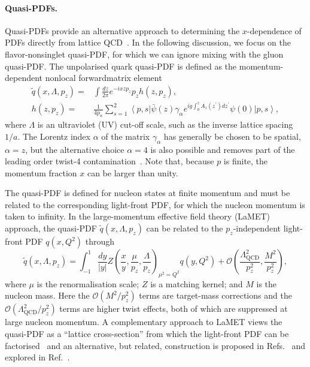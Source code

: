\paragraph*{Quasi-PDFs.}
Quasi-PDFs provide an alternative approach to determining the $x$-dependence of PDFs directly from lattice QCD~\cite{Ji:2013dva,Ji:2014gla}. In the following discussion, we focus on the flavor-nonsinglet quasi-PDF, for which we can ignore mixing with the gluon quasi-PDF. The unpolarised quark quasi-PDF is defined as the momentum-dependent
nonlocal forwardmatrix element
\begin{align}\label{eq:qPDF}
\widetilde{q}(x,\Lambda,p_z)  = {} &  \int \frac{dz}{2\pi} e^{-i x z p_z} p_z h(z,p_z), \nonumber \\
h(z,p_z) = {} &
\frac{1}{4 p_{\alpha}}\sum_{s=1}^2\left\langle p,s\right\vert \bar{\psi}(z)\gamma_\alpha e^{ig\int_0^z
A_z(z^\prime) dz^\prime} \psi(0) \left\vert p,s\right\rangle,
\end{align}
where $\Lambda$ is an ultraviolet (UV) cut-off scale, such as the inverse lattice spacing $1/a$. The Lorentz index $\alpha$ of the matrix $\gamma_\alpha$ has generally be chosen to be spatial, $\alpha = z$, but the alternative choice $\alpha = 4$ is also possible and removes part of the leading order twist-4 contamination~\cite{Xiong:2013bka,Radyushkin:2016hsy}. 
Note that, because $p$ is finite, the momentum fraction $x$ can be larger than unity.

The quasi-PDF is defined for nucleon states at finite momentum and must be related to the corresponding light-front PDF, for which the nucleon momentum is taken to infinity.
In the  large-momentum  effective field theory (LaMET) approach, the quasi-PDF $\widetilde{q}(x,\Lambda,p_z)$ can be related to the $p_z$-independent
light-front PDF $q(x,Q^2)$ through~\cite{Ji:2013dva,Ji:2014gla}
\begin{equation} \label{eq:qPDFmatching}
\widetilde{q}(x,\Lambda ,p_z) = 
  \int_{-1}^1 \frac{dy}{\left\vert y\right\vert} 
    Z\left( \frac{x}{y}, \frac{\mu}{p_z}, \frac{\Lambda}{p_z}\right)_{\mu^2 = Q^2} q(y,Q^2) +
  \mathcal{O}\left( \frac{\Lambda_\text{QCD}^2}{p_z^2},\frac{M^2}{p_z^2}\right), 
\end{equation}
where $\mu$ is the renormalisation scale;
$Z$ is a matching kernel; and $M$ is the nucleon mass.
Here the $\mathcal{O}\left(M^2/p_z^2\right)$ terms are target-mass corrections and the $\mathcal{O}\left(\Lambda_\text{QCD}^2/p_z^2\right)$ terms are higher twist effects, both of which are suppressed at large nucleon momentum. A complementary approach to LaMET views the quasi-PDF as a ``lattice cross-section'' from which the light-front PDF can be factorised~\cite{Ma:2014jla,Ma:2014jga,Ma:2017pxb} and an alternative, but related, construction is proposed in Refs.~\cite{Radyushkin:2016hsy,Radyushkin:2017cyf} and explored in Ref.~\cite{Orginos:2017kos}.

